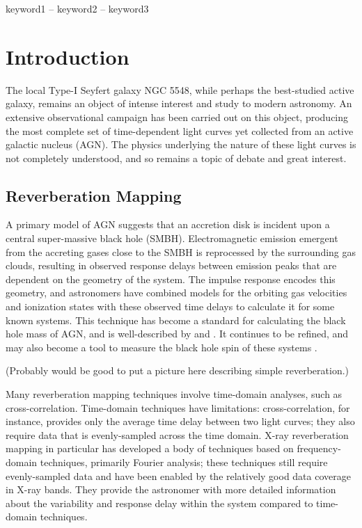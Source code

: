 \documentclass[a4paper,fleqn,usenatbib]{article}
\begin{document}
\begin{keywords}
keyword1 -- keyword2 -- keyword3
\end{keywords}



\section{Introduction}
The local Type-I Seyfert galaxy NGC 5548, while perhaps the best-studied
active galaxy, remains an object of intense interest and study to modern
astronomy. An extensive observational campaign has been carried out on this
object, producing the most complete set of time-dependent light curves yet
collected from an active galactic nucleus (AGN). The physics underlying the
nature of these light curves is not completely understood, and so remains a
topic of debate and great interest.

	\subsection{Reverberation Mapping}
	A primary model of AGN suggests that an accretion disk is incident upon a
	central super-massive black hole (SMBH). Electromagnetic emission emergent
	from the accreting gases close to the SMBH is reprocessed by the
	surrounding gas clouds, resulting in observed response delays between
	emission peaks that are dependent on the geometry of the system. The
	impulse response encodes this geometry, and astronomers have combined
	models for the orbiting gas velocities and ionization states with these
	observed time delays to calculate it for some known systems. This
	technique has become a standard for calculating the black hole mass of
	AGN, and is well-described by \cite{2007MNRAS.380..669C} and
	\cite{2014A&ARv..22...72U}. It continues to be refined, and may also
	become a tool to measure the black hole spin of these systems
	\citep{2016arXiv160606736K}.

	(Probably would be good to put a picture here describing simple
	reverberation.)

	Many reverberation mapping techniques involve time-domain analyses, such
	as cross-correlation. Time-domain techniques have limitations:
	cross-correlation, for instance, provides only the average time delay
	between two light curves; they also require data that is evenly-sampled
	across the time domain. X-ray reverberation mapping in particular has
	developed a body of techniques based on frequency-domain techniques,
	primarily Fourier analysis; these techniques still require evenly-sampled
	data and have been enabled by the relatively good data coverage in X-ray
	bands. They provide the astronomer with more detailed information about
	the variability and response delay within the system compared to
	time-domain techniques.
\end{document}
